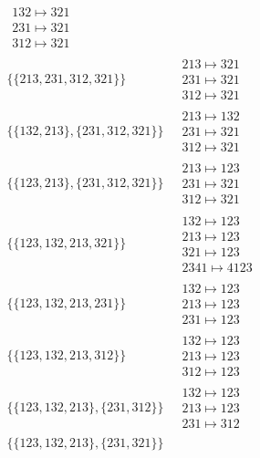 \begin{scriptsize}
\begin{align}
\begin{matrix}
132 \mapsto 321
\\
231 \mapsto 321
\\
312 \mapsto 321
\end{matrix}
\\
\{\{213, 231, 312, 321\}\}
\ 
&
\begin{matrix}
213 \mapsto 321
\\
231 \mapsto 321
\\
312 \mapsto 321
\end{matrix}
\\
\{\{132, 213\}, \{231, 312, 321\}\}
\ 
&
\begin{matrix}
213 \mapsto 132
\\
231 \mapsto 321
\\
312 \mapsto 321
\end{matrix}
\\
\{\{123, 213\}, \{231, 312, 321\}\}
\ 
&
\begin{matrix}
213 \mapsto 123
\\
231 \mapsto 321
\\
312 \mapsto 321
\end{matrix}
\\
\{\{123, 132, 213, 321\}\}
\ 
&
\begin{matrix}
132 \mapsto 123
\\
213 \mapsto 123
\\
321 \mapsto 123
\\
2341 \mapsto 4123
\end{matrix}
\\
\{\{123, 132, 213, 231\}\}
\ 
&
\begin{matrix}
132 \mapsto 123
\\
213 \mapsto 123
\\
231 \mapsto 123
\end{matrix}
\\
\{\{123, 132, 213, 312\}\}
\ 
&
\begin{matrix}
132 \mapsto 123
\\
213 \mapsto 123
\\
312 \mapsto 123
\end{matrix}
\\
\{\{123, 132, 213\}, \{231, 312\}\}
\ 
&
\begin{matrix}
132 \mapsto 123
\\
213 \mapsto 123
\\
231 \mapsto 312
\end{matrix}
\\
\{\{123, 132, 213\}, \{231, 321\}\}
\ 
&
\begin{matrix}

\end{matrix}
\end{align}
\end{scriptsize}
